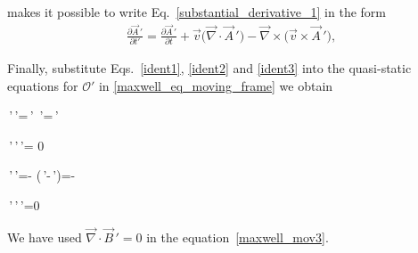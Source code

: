 \documentclass[11pt,a4paper,oneside]{book}
\numberwithin{equation}{section}
\theoremstyle{it}
\theoremstyle{definition}
\begin{document}
makes it possible to write Eq.~\ref{substantial_derivative_1} in the form
\begin{equation}\label{ident3}
	\begin{aligned}
		\frac{\partial \vec{A}\,'}{\partial t'} = \frac{\partial 
		\vec{A}\,'}{\partial t} + 
		\vec{v}\big(\vec{\nabla}\cdot\vec{A}\,'\big)-\vec{\nabla}\times\big(\vec{v}\times\vec{A}\,'\big),
	\end{aligned}
\end{equation} 

\begin{mybox}
	Finally, substitute Eqs.~\ref{ident1}, \ref{ident2} and \ref{ident3} into 
	the quasi-static equations for $\mathcal{O}'$ in 
	\ref{maxwell_eq_moving_frame} we obtain 
	\begin{flalign}\label{maxwell_mov1}
		\vec{\nabla}\,'\times{}\,'=\,' 
		\quad\Rightarrow\quad\vec{\nabla}\times{}\,'=\,'\qquad{}
	\end{flalign} 
	\begin{flalign}\label{maxwell_mov2}
		\vec{\nabla}\,'\cdot{}\,'\quad\Rightarrow\quad\vec{\nabla}\cdot{}\,'=
		 0\qquad{}
	\end{flalign} 
	\begin{flalign}\label{maxwell_mov3}
		\vec{\nabla}\,'\times{}\,'=- 
		\quad\Rightarrow\quad\vec{\nabla}\times\big(\,'-\times{}\,'\big)=-\qquad{}
	\end{flalign} 
	\begin{flalign}\label{maxwell_mov4}
		\vec{\nabla}\,'\cdot{}\,'\quad\Rightarrow\quad\vec{\nabla}\cdot{}\,'=0\qquad{}
	\end{flalign} 
	We have used $\vec{\nabla}\cdot\vec{B}\,'=0$ in the 
	equation~\ref{maxwell_mov3}. 
\end{mybox}
\end{document}
